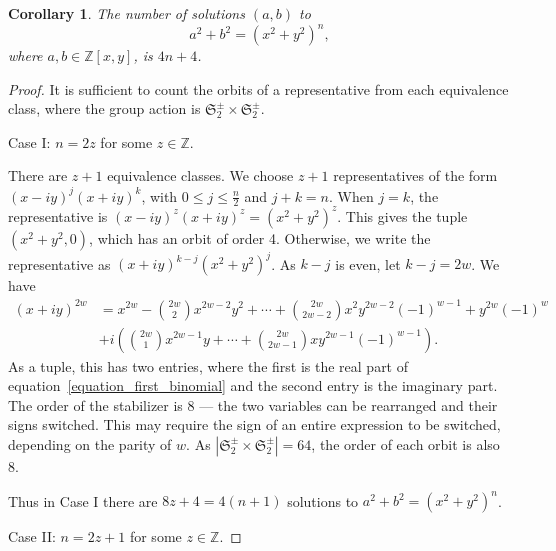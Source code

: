 \documentclass[12pt,table]{article}
\newtheorem{corollary}[theorem]{Corollary}
\theoremstyle{definition}
\theoremstyle{remark}
\newcommand{\Zzz}{\mathbb Z}
\numberwithin{equation}{section}
\begin{document}
\begin{corollary}

The number of solutions $ (a, b) $ to
\[
a^2 + b^2 = (x^2 + y^2)^n,
\]
where $ a, b \in \Zzz[x,y] $, is $4n + 4$.

\end{corollary}
\begin{proof}
It is sufficient to count the orbits of a representative from each
equivalence class, where the group action is
$ \mathfrak{S}_2^\pm \times \mathfrak{S}_2^\pm $.

\noindent
Case I: $ n = 2z $ for some $ z \in \Zzz $.

There are $ z + 1 $ equivalence classes. We choose $ z + 1 $
representatives of the form $ (x - iy)^j (x + iy)^k $, with
$ 0 \leq j \leq \frac{n}{2}$ and $ j + k = n $.
When $ j = k $, the representative
is $ (x - iy)^z (x + iy)^z = ( x^2 + y^2 ) ^ z $.
This gives the tuple $ ( x^2 + y^2, 0 ) $, which has an orbit of order 4.
Otherwise, we write the representative as $ (x + iy)^{k-j} (x^2 + y^2)^j $.
As $ k - j $ is even, let $ k - j = 2w $. We have
\begin{align}
\label{equation_first_binomial}
(x + iy) ^ {2w} &= x ^ {2w} - \binom{2w}{2}  x^{2w - 2 } y^2
+ \cdots + \binom{2w}{2w-2} x^2 y^{2w - 2} (-1) ^ {w - 1}
+  y^{2w} (-1) ^ {w} \nonumber
\\
&+ i \left( \binom{2w}{1} x ^ {2w - 1} y + \cdots +
\binom{2w}{2w-1}  x y ^ {2w -1} (-1)^{w-1} \right).
\end{align}
As a tuple, this has two entries, where the first is the real part
of equation~\ref{equation_first_binomial} and the second entry
is the imaginary part.
The order of the stabilizer is 8 --- the two variables can be rearranged and their
signs switched. This may require the sign of an entire expression to be switched,
depending on the parity of $ w $.
As $ | \mathfrak{S}_2^\pm \times \mathfrak{S}_2^\pm | = 64$, the order of each orbit
is also 8. 

Thus in Case I there are $ 8z + 4 = 4 (n + 1 ) $ solutions
to $ a^2 + b^2 = (x^2 + y^2)^n $.



\noindent
Case II: $ n = 2z + 1$ for some $ z \in \Zzz $.


\end{proof}
\end{document}
